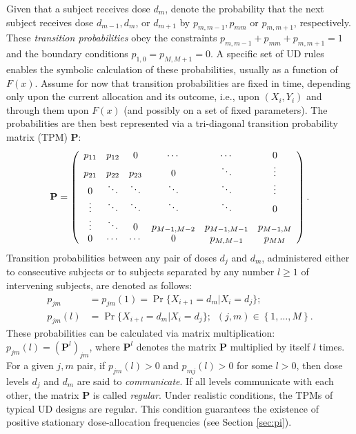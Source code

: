  Given that a subject receives dose $d_m$, denote the probability that the next subject receives dose $d_{m-1},d_m$, or $d_{m+1}$ by $p_{m,m-1},p_{mm}$ or $p_{m,m+1}$, respectively. These  \emph{transition probabilities} obey the constraints $p_{m,m-1}+p_{mm}+p_{m,m+1}=1$ and the boundary conditions $p_{1,0}=p_{M,M+1}=0$. A specific set of UD rules enables the symbolic calculation of these probabilities, usually as a function of $F(x)$. Assume for now that transition probabilities are fixed in time, depending only upon the current allocation and its outcome, i.e., upon $\left(X_i,Y_i\right)$ and through them upon $F(x)$ (and possibly on a set of fixed parameters). The probabilities are then best represented via a tri-diagonal transition probability matrix (TPM) $\mathbf{P}$:
\begin{equation}\label{eq:genericPmat}
\bf{P}=\left(
\begin{array}{cccccc}
  p_{11}& p_{12} & 0 & \cdots & \cdots & 0 \\
  p_{21} & p_{22} & p_{23} & 0 & \ddots & \vdots \\
  0 & \ddots & \ddots & \ddots & \ddots & \vdots \\
  \vdots & \ddots & \ddots & \ddots & \ddots & 0 \\
  \vdots & \ddots & 0 & p_{M-1,M-2} & p_{M-1,M-1} & p_{M-1,M} \\
  0 & \cdots & \cdots & 0 & p_{M,M-1} & p_{MM}\\
\end{array}
\right).
\end{equation}
Transition probabilities between any pair of doses $d_j$ and $d_m$, administered either to consecutive subjects or to subjects separated by any number $l\geq 1$ of intervening subjects, are denoted as follows:
\begin{equation*}
\begin{array}{rl}
p_{jm}&=p_{jm}(1)=\Pr\{X_{i+1}=d_m|X_i=d_j\};\\
p_{jm}(l)&=\Pr\{X_{i+l}=d_m|X_i=d_j\};\,\,\,(j,m)\in\left\{1,\ldots,M\right\}.
\end{array}
\end{equation*}
These probabilities can be calculated via matrix multiplication: $p_{jm}(l)=\left(\mathbf{P}^l\right)_{jm}$, where $\mathbf{P}^l$ denotes the matrix $\mathbf{P}$ multiplied by itself $l$ times. For a given $j,m$ pair, if $p_{jm}(l)>0$ and $p_{mj}(l)>0$  for some $l>0$, then dose levels $d_j$ and $d_m$ are said to \emph{communicate}. If all levels communicate with each other, the matrix $\mathbf{P}$ is called \emph{regular}. Under realistic conditions, the TPMs of typical UD designs are regular.  This condition guarantees the existence of positive stationary dose-allocation frequencies (see Section \ref{sec:pi}).


